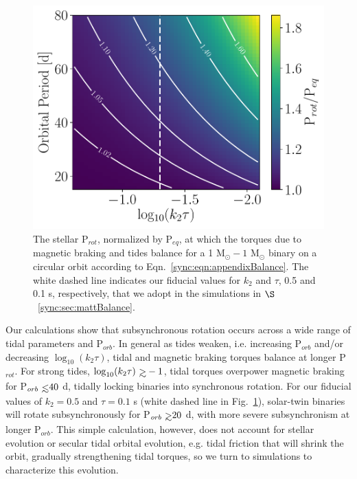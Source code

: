 \begin{figure}
	\includegraphics[width=\columnwidth]{analyticTorque.pdf}
   \caption{The stellar P$_{rot}$, normalized by P$_{eq}$, at which the torques due to magnetic braking and tides balance for a 1 M$_{\odot} - 1$ M$_{\odot}$ binary on a circular orbit according to Eqn.~\ref{sync:eqn:appendixBalance}. The white dashed line indicates our fiducial values for $k_2$ and $\tau$, 0.5 and 0.1 s, respectively, that we adopt in the simulations in $\S$~\ref{sync:sec:mattBalance}.}%
    \label{sync:fig:analyticBalance}%
\end{figure}

Our calculations show that subsynchronous rotation occurs across a wide range of tidal parameters and P$_{orb}$. In general as tides weaken, i.e. increasing P$_{orb}$ and/or decreasing $\log_{10}(k_2 \tau)$, tidal and magnetic braking torques balance at longer P$_{rot}$. For strong tides, $\log_{10}(k_2 \tau) \gsim -1$, tidal torques overpower magnetic braking for P$_{orb} \lsim 40$ d, tidally locking binaries into synchronous rotation. For our fiducial values of $k_2 = 0.5$ and $\tau = 0.1$ s (white dashed line in Fig.~\ref{sync:fig:analyticBalance}), solar-twin binaries will rotate subsynchronously for P$_{orb} \gsim 20$ d, with more severe subsynchronism at longer P$_{orb}$. This simple calculation, however, does not account for stellar evolution or secular tidal orbital evolution, e.g. tidal friction that will shrink the orbit, gradually strengthening tidal torques, so we turn to simulations to characterize this evolution. 



